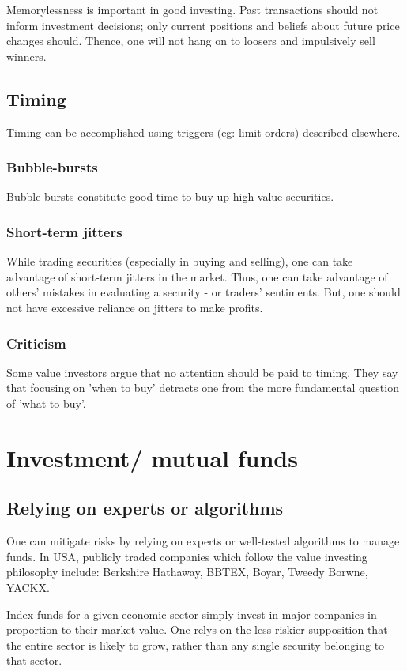 \documentclass[oneside, article]{memoir}
\begin{document}
Memorylessness is important in good investing. Past transactions should not inform investment decisions; only current positions and beliefs about future price changes should. Thence, one will not hang on to loosers and impulsively sell winners.

\subsection{Timing}
Timing can be accomplished using triggers (eg: limit orders) described elsewhere.

\subsubsection{Bubble-bursts}
Bubble-bursts constitute good time to buy-up high value securities.

\subsubsection{Short-term jitters}
While trading securities (especially in buying and selling), one can take advantage of short-term jitters in the market. Thus, one can take advantage of others' mistakes in evaluating a security - or traders' sentiments. But, one should not have excessive reliance on jitters to make profits.

\subsubsection{Criticism}
Some value investors argue that no attention should be paid to timing. They say that focusing on 'when to buy' detracts one from the more fundamental question of 'what to buy'.

\section{Investment/ mutual funds}
\subsection{Relying on experts or algorithms}
One can mitigate risks by relying on experts or well-tested algorithms to manage funds. In USA, publicly traded companies which follow the value investing philosophy include: Berkshire Hathaway, BBTEX, Boyar, Tweedy Borwne, YACKX.

Index funds for a given economic sector simply invest in major companies in proportion to their market value. One relys on the less riskier supposition that the entire sector is likely to grow, rather than any single security belonging to that sector.
\end{document}
